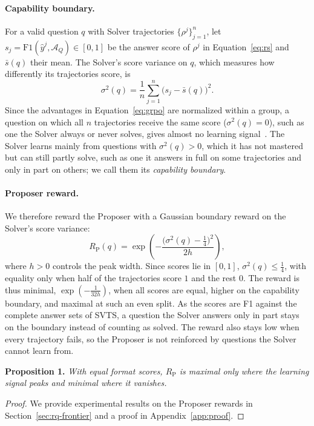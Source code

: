 \paragraph{Capability boundary.}
For a valid question $q$ with Solver trajectories $\{\rho^{j}\}_{j=1}^{n}$, let $s_j=\mathrm{F1}(\hat{y}^{j},\mathcal{A}_Q)\in[0,1]$ be the answer score of $\rho^{j}$ in Equation~\ref{eq:rs} and $\bar{s}(q)$ their mean. The Solver's score variance on $q$, which measures how differently its trajectories score, is
\begin{equation}
\label{eq:cbar}
\sigma^{2}(q)=\frac1n\sum_{j=1}^{n}\bigl(s_j-\bar{s}(q)\bigr)^{2}.
\end{equation}
Since the advantages in Equation~\ref{eq:grpo} are normalized within a group, a question on which all $n$ trajectories receive the same score ($\sigma^{2}(q)=0$), such as one the Solver always or never solves, gives almost no learning signal~\citep{DAPO}. The Solver learns mainly from questions with $\sigma^{2}(q)>0$, which it has not mastered but can still partly solve, such as one it answers in full on some trajectories and only in part on others; we call them its \emph{capability boundary}.

\paragraph{Proposer reward.}
We therefore reward the Proposer with a Gaussian boundary reward on the Solver's score variance:
\begin{equation}
\label{eq:rp}
R_{\mathrm{P}}(q)=\exp\!\left(-\frac{\bigl(\sigma^{2}(q)-\tfrac14\bigr)^{2}}{2h}\right),
\end{equation}
where $h>0$ controls the peak width. Since scores lie in $[0,1]$, $\sigma^{2}(q)\le\tfrac14$, with equality only when half of the trajectories score $1$ and the rest $0$. The reward is thus minimal, $\exp(-\tfrac{1}{32h})$, when all scores are equal, higher on the capability boundary, and maximal at such an even split. As the scores are F1 against the complete answer sets of SVTS, a question the Solver answers only in part stays on the boundary instead of counting as solved. The reward also stays low when every trajectory fails, so the Proposer is not reinforced by questions the Solver cannot learn from.

\textbf{Proposition 1.} \textit{With equal format scores, $R_{\mathrm{P}}$ is maximal only where the learning signal peaks and minimal where it vanishes.}\vspace{-2mm}
\begin{proof}
We provide experimental results on the Proposer rewards in Section~\ref{sec:rq-frontier} and a proof in Appendix~\ref{app:proof}.
\end{proof}

